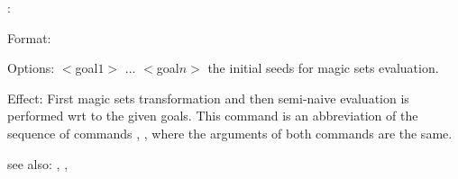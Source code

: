 :

Format: 

Options: $<$goal$1>$ ... $<$goal$n>$ the initial seeds for magic sets evaluation.

Effect: First magic sets transformation and then semi-naive evaluation is 
	performed wrt to the given goals. This command is an abbreviation of the
	sequence of commands , , where the arguments
	of both commands are the same.

see also: \eval, , 

